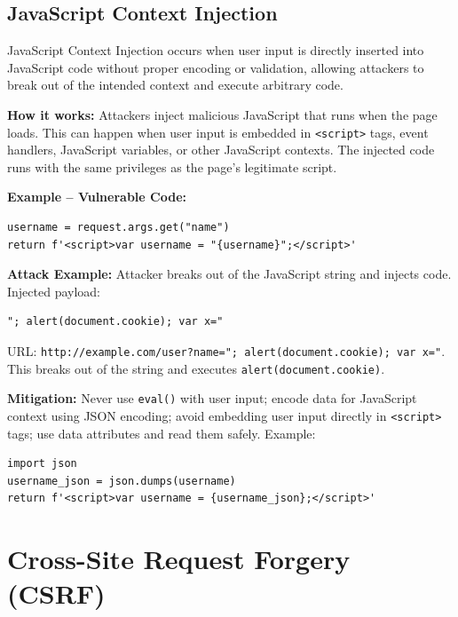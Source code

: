 \subsection{JavaScript Context Injection}
\label{sec:xss_js_context}

JavaScript Context Injection occurs when user input is directly inserted into JavaScript code without proper encoding or validation, allowing attackers to break out of the intended context and execute arbitrary code.

\textbf{How it works:} Attackers inject malicious JavaScript that runs when the page loads. This can happen when user input is embedded in \texttt{<script>} tags, event handlers, JavaScript variables, or other JavaScript contexts. The injected code runs with the same privileges as the page's legitimate script.

\textbf{Example -- Vulnerable Code:}

\begin{lstlisting}[style=pycode]
username = request.args.get("name")
return f'<script>var username = "{username}";</script>'
\end{lstlisting}

\textbf{Attack Example:} Attacker breaks out of the JavaScript string and injects code. Injected payload:
\begin{lstlisting}[style=attackcode]
"; alert(document.cookie); var x="
\end{lstlisting}
URL: \texttt{http://example.com/user?name="; alert(document.cookie); var x="}. This breaks out of the string and executes \texttt{alert(document.cookie)}.

\textbf{Mitigation:} Never use \texttt{eval()} with user input; encode data for JavaScript context using JSON encoding; avoid embedding user input directly in \texttt{<script>} tags; use data attributes and read them safely. Example:

\begin{lstlisting}[style=pycode]
import json
username_json = json.dumps(username)
return f'<script>var username = {username_json};</script>'
\end{lstlisting}

\section{Cross-Site Request Forgery (CSRF)}
\label{sec:background_csrf}

